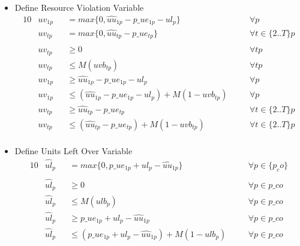 \begin{itemize}
	
	\item Define Resource Violation Variable
	\begin{alignat}{10}
		& uv_{1p} 
			&& = max\{0 , \hat{uu}_{1p} - p\_{ue}_{1p} - ul_{p}\} \quad 
			&& \forall p \\ 
		& uv_{tp} 
			&& = max\{0 , \hat{uu}_{tp} - p\_{ue}_{tp}\} \quad
			&& \forall t \in \{2..T\} p \\ \\
		& uv_{tp} 
			&&\ge 0 \quad
			&& \forall tp \\
		& uv_{tp} 
			&& \le  M(uvb_{tp}) \quad
			&& \forall tp \\
		& uv_{1p} 
			&&\ge \hat{uu}_{1p} - p\_ue_{1p} - ul_{p} \quad
			&& \forall p \\
		& uv_{1p} 
		&& \le  (\hat{uu}_{1p} - p\_ue_{1p} - ul_{p}) + M(1-uvb_{tp}) \quad
		&& \forall p \\
		& uv_{tp} 
			&&\ge \hat{uu}_{tp} - p\_ue_{tp} \quad
			&& \forall t \in \{2..T \} p \\
		& uv_{tp} 
		&& \le  (\hat{uu}_{tp} - p\_ue_{tp}) + M(1-uvb_{tp}) \quad
		&& \forall t \in \{ 2..T \} p \\
	\end{alignat}
	
	\item Define Units Left Over Variable
	\begin{alignat}{10}
		& \hat{ul}_{p} 
			&& = max \{0, p\_ue_{1p} + ul_{p} - \hat{uu}_{1p} \}
			&& \forall p \in \{p_co\} \\ \\
		& \hat{ul}_{p} 
			&& \ge 0 \quad 
			&& \forall p  \in p\_co \\
		& \hat{ul}_{p} 
			&& \le M (ulb_{p}) \quad 
			&& \forall p  \in p\_co\\
		& \hat{ul}_{p} 
			&& \ge p\_ue_{1p} + ul_{p} - \hat{uu}_{1p} \quad 
			&& \forall p  \in p\_co\\
		& \hat{ul}_{p} 
			&& \le (p\_ue_{1p} + ul_{p} - \hat{uu}_{1p}) + M(1-ulb_{p}) \quad 
			&& \forall p  \in p\_co
	\end{alignat}
	

\end{itemize}
